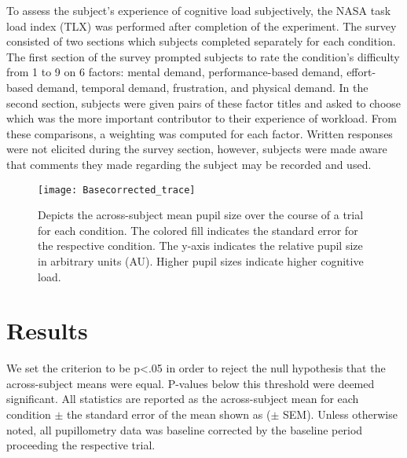 \documentclass[10pt]{article}
\begin{document}
To assess the subject's experience of cognitive load subjectively,
the NASA task load index (TLX) was performed after completion
of the experiment\cite{Zickler2013a}.  The survey consisted of two
sections which subjects completed separately for each
condition.  The first section of the survey prompted subjects
to rate the condition's difficulty from 1 to 9 on 6 factors:
mental demand, performance-based demand, effort-based demand,
temporal demand, frustration, and physical demand. In the
second section, subjects were given pairs of these factor
titles and asked to choose which was the more important
contributor to their experience of workload.  From these
comparisons, a weighting was computed for each factor.
Written responses were not elicited during the survey section,
however, subjects were made aware that comments they made
regarding the subject may be recorded and used.




\begin{figure}[t]
  \centering
  \texttt{[image: Basecorrected\_trace]}
  \caption{Depicts the across-subject mean pupil size over the course of a trial
  for each condition.  The colored fill indicates the standard error
  for the respective condition.  The y-axis indicates the
  relative pupil size in arbitrary units (AU). Higher pupil
  sizes indicate higher cognitive load.}
  \label{trialtrace}
\end{figure}

\section{Results}

We set the criterion to be p<.05 in order to reject the null
hypothesis that the across-subject means were equal. P-values
below this threshold were deemed significant. All statistics
are reported as the across-subject mean for each condition $\pm$
the standard error of the mean shown as ($\pm$ SEM).  Unless otherwise
noted, all pupillometry data was baseline corrected 
by the baseline period proceeding the respective trial.
\end{document}
